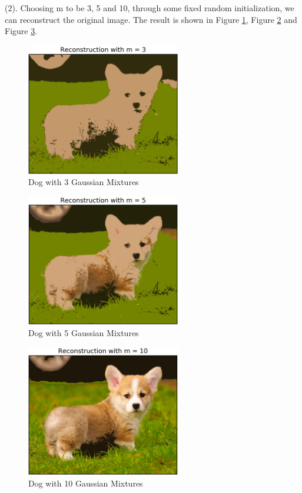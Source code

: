 (2). Choosing m to be 3, 5 and 10, through some fixed random initialization, we can reconstruct the original image. The result is shown in Figure \ref{fig:corgi_tf_3}, Figure \ref{fig:corgi_tf_5} and Figure \ref{fig:corgi_tf_10}.

\begin{figure}[H]
\centering
\includegraphics[width=0.6\textwidth]{./figures/corgi_tf_3.png}
\caption{\label{fig:corgi_tf_3} Dog with 3 Gaussian Mixtures}
\end{figure}

\begin{figure}[H]
\centering
\includegraphics[width=0.6\textwidth]{./figures/corgi_tf_5.png}
\caption{\label{fig:corgi_tf_5} Dog with 5 Gaussian Mixtures}
\end{figure}

\begin{figure}[H]
\centering
\includegraphics[width=0.6\textwidth]{./figures/corgi_tf_10.png}
\caption{\label{fig:corgi_tf_10} Dog with 10 Gaussian Mixtures}
\end{figure}

